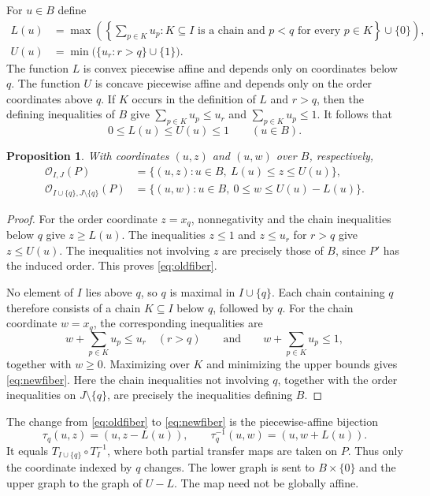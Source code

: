 \documentclass[a4paper,12pt]{amsart}
\newtheorem{proposition}[theorem]{Proposition}
\theoremstyle{definition}
\theoremstyle{remark}
\newcommand{\OO}{\mathcal O}
\begin{document}
For $u\in B$ define
\begin{align*}
 L(u)&=\max\left( \left\{\sum_{p\in K}u_p: K\subseteq I\text{ is a chain and }p<q\text{ for every }p\in K\right\} \cup\{0\}\right),\\
 U(u)&=\min\bigl(\{u_r:r>q\}\cup\{1\}\bigr).
\end{align*}
The function $L$ is convex piecewise affine and depends only on coordinates below $q$. 
The function $U$ is concave piecewise affine and depends only on the order coordinates above $q$. 
If $K$ occurs in the definition of $L$ and $r>q$, then the defining inequalities of $B$ give $\sum_{p\in K}u_p\leq u_r$ and $\sum_{p\in K}u_p\leq1$.
It follows that
\[
 0\leq L(u)\leq U(u)\leq1 \qquad (u\in B).
\]

\begin{proposition}\label{prop:fibers}
With coordinates $(u,z)$ and $(u,w)$ over $B$, respectively,
\begin{align}
 \OO_{I,J}(P)&=\{(u,z):u\in B,\ L(u)\leq z\leq U(u)\},\label{eq:oldfiber}\\
 \OO_{I\cup\{q\},J\setminus\{q\}}(P)&= \{(u,w):u\in B,\ 0\leq w\leq U(u)-L(u)\}.\label{eq:newfiber}
\end{align}
\end{proposition}

\begin{proof}
For the order coordinate $z=x_q$, nonnegativity and the chain inequalities below $q$ give $z\geq L(u)$.  
The inequalities $z\leq1$ and $z\leq u_r$ for $r>q$ give $z\leq U(u)$. 
The inequalities not involving $z$ are precisely those of $B$, since $P'$ has the induced order. 
This proves \eqref{eq:oldfiber}.

No element of $I$ lies above $q$, so $q$ is maximal in $I\cup\{q\}$. 
Each chain containing $q$ therefore consists of a chain $K\subseteq I$ below $q$, followed by $q$.
For the chain coordinate $w=x_q$, the corresponding inequalities are
\[
 w+\sum_{p\in K}u_p\leq u_r\quad(r>q)
 \qquad\text{and}\qquad
 w+\sum_{p\in K}u_p\leq1,
\]
together with $w\geq0$.  
Maximizing over $K$ and minimizing the upper bounds gives \eqref{eq:newfiber}. 
Here the chain inequalities not involving $q$, together with the order inequalities on $J\setminus\{q\}$, are precisely the inequalities defining $B$.
\end{proof}

The change from \eqref{eq:oldfiber} to \eqref{eq:newfiber} is the
piecewise-affine bijection
\[
 \tau_q(u,z)=(u,z-L(u)),\qquad
 \tau_q^{-1}(u,w)=(u,w+L(u)).
\]
It equals $T_{I\cup\{q\}}\circ T_I^{-1}$, where both partial transfer maps are taken on $P$. 
Thus only the coordinate indexed by $q$ changes. 
The lower graph is sent to $B\times\{0\}$ and the upper graph to the graph of $U-L$. 
The map need not be globally affine.
\end{document}
